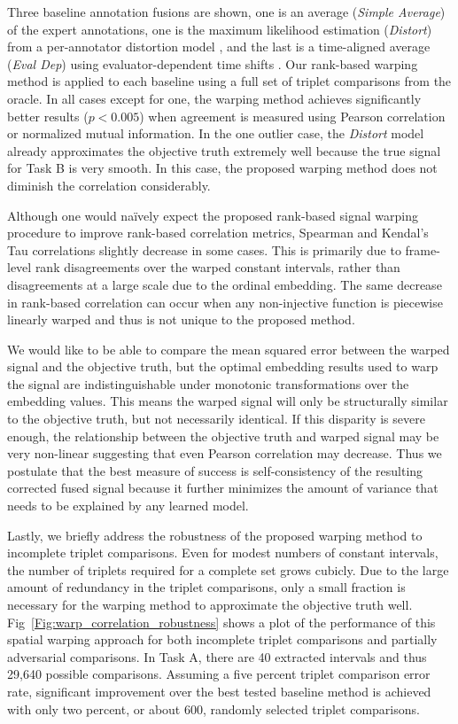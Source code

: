 \documentclass[10pt,letterpaper]{article}
\begin{document}
Three baseline annotation fusions are shown, one is an average (\textit{Simple Average}) of the expert annotations, one is the maximum likelihood estimation (\textit{Distort}) from a per-annotator distortion model \cite{Gupta2016}, and the last is a time-aligned average (\textit{Eval Dep}) using evaluator-dependent time shifts \cite{Mariooryad2015}.  Our rank-based warping method is applied to each baseline using a full set of triplet comparisons from the oracle.  In all cases except for one, the warping method achieves significantly better results ($p<0.005$) when agreement is measured using Pearson correlation or normalized mutual information.  In the one outlier case, the \textit{Distort} model already approximates the objective truth extremely well because the true signal for Task B is very smooth.  In this case, the proposed warping method does not diminish the correlation considerably.

Although one would na\"ively expect the proposed rank-based signal warping procedure to improve rank-based correlation metrics, Spearman and Kendal's Tau correlations slightly decrease in some cases.  This is primarily due to frame-level rank disagreements over the warped constant intervals, rather than disagreements at a large scale due to the ordinal embedding.  The same decrease in rank-based correlation can occur when any non-injective function is piecewise linearly warped and thus is not unique to the proposed method.

We would like to be able to compare the mean squared error between the warped signal and the objective truth, but the optimal embedding results used to warp the signal are indistinguishable under monotonic transformations over the embedding values.  This means the warped signal will only be structurally similar to the objective truth, but not necessarily identical.  If this disparity is severe enough, the relationship between the objective truth and warped signal may be very non-linear suggesting that even Pearson correlation may decrease.  Thus we postulate that the best measure of success is self-consistency of the resulting corrected fused signal because it further minimizes the amount of variance that needs to be explained by any learned model.

Lastly, we briefly address the robustness of the proposed warping method to incomplete triplet comparisons. Even for modest numbers of constant intervals, the number of triplets required for a complete set grows cubicly.  Due to the large amount of redundancy in the triplet comparisons, only a small fraction is necessary for the warping method to approximate the objective truth well.  Fig~\ref{Fig:warp_correlation_robustness} shows a plot of the performance of this spatial warping approach for both incomplete triplet comparisons and partially adversarial comparisons.  In Task A, there are 40 extracted intervals and thus 29,640 possible comparisons.  Assuming a five percent triplet comparison error rate, significant improvement over the best tested baseline method is achieved with only two percent, or about 600, randomly selected triplet comparisons.
\end{document}
